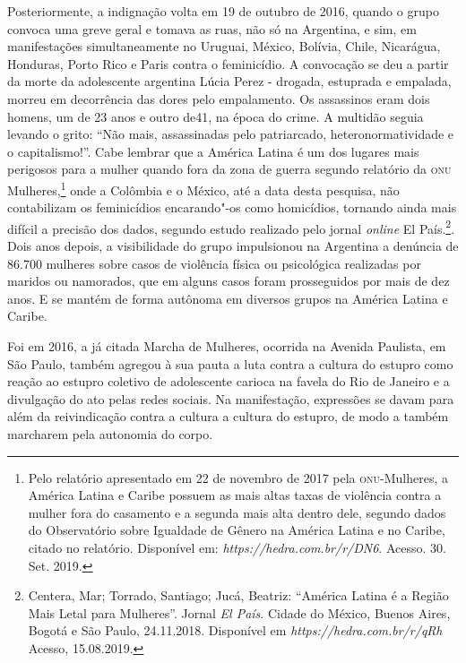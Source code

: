 Posteriormente, a indignação volta em 19 de outubro de 2016, quando o
grupo convoca uma greve geral e tomava as ruas, não só na Argentina, e
sim, em manifestações simultaneamente no Uruguai, México, Bolívia,
Chile, Nicarágua, Honduras, Porto Rico e Paris contra o feminicídio. A
convocação se deu a partir da morte da adolescente argentina Lúcia Perez
- drogada, estuprada e empalada, morreu em decorrência das dores pelo
empalamento. Os assassinos eram dois homens, um de 23 anos e outro de41,
na época do crime. A multidão seguia levando o grito: ``Não mais,
assassinadas pelo patriarcado, heteronormatividade e o capitalismo!''.
Cabe lembrar que a América Latina é um dos lugares mais perigosos para a
mulher quando fora da zona de guerra segundo relatório da \textsc{onu}
Mulheres,\footnote{Pelo relatório apresentado em 22 de novembro de 2017
  pela \textsc{onu}-Mulheres, a América Latina e Caribe possuem as mais altas
  taxas de violência contra a mulher fora do casamento e a segunda mais
  alta dentro dele, segundo dados do Observatório sobre Igualdade de
  Gênero na América Latina e no Caribe, citado no relatório. Disponível
  em:
  \emph{https://hedra.com.br/r/DN6}.
  Acesso. 30. Set. 2019.} onde a Colômbia e o México, até a data desta
pesquisa, não contabilizam os feminicídios encarando"-os como homicídios,
tornando ainda mais difícil a precisão dos dados, segundo estudo
realizado pelo jornal \emph{online} El País.\footnote{Centera, Mar; Torrado,
  Santiago; Jucá, Beatriz: ``América Latina é a Região Mais Letal para
  Mulheres''. Jornal \emph{El País}. Cidade do México, Buenos Aires,
  Bogotá e São Paulo, 24.11.2018. Disponível em
  \emph{https://hedra.com.br/r/qRh}
  Acesso, 15.08.2019.}. Dois anos depois, a visibilidade do grupo
impulsionou na Argentina a denúncia de 86.700 mulheres sobre casos de
violência física ou psicológica realizadas por maridos ou namorados, que
em alguns casos foram prosseguidos por mais de dez anos. E se mantém de
forma autônoma em diversos grupos na América Latina e Caribe.

Foi em 2016, a já citada Marcha de Mulheres, ocorrida na Avenida
Paulista, em São Paulo, também agregou à sua pauta a luta contra a
cultura do estupro como reação ao estupro coletivo de adolescente
carioca na favela do Rio de Janeiro e a divulgação do ato pelas redes
sociais. Na manifestação, expressões se davam para além da reivindicação
contra a cultura a cultura do estupro, de modo a também marcharem pela
autonomia do corpo.

